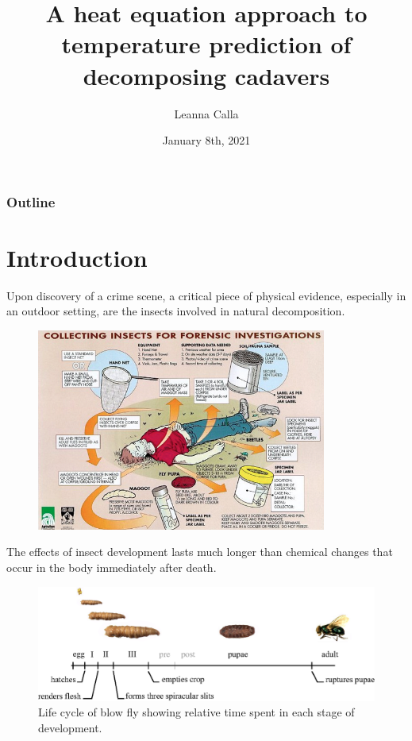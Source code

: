 \documentclass{beamer}
\title{A heat equation approach to temperature prediction of decomposing cadavers}
\author{Leanna Calla}
\institute{University of Ontario Institute of Technology}
\date{January 8th, 2021}
\begin{document}
\frame{\titlepage}

\begin{frame}
  \frametitle{Outline}
\tableofcontents
\end{frame}

\section{Introduction}
  
\begin{frame}
  Upon discovery of a crime scene, a critical piece of physical
  evidence, especially in an outdoor setting, are the insects involved
  in natural decomposition.
  \begin{figure}
    \includegraphics[width=0.85\textwidth]{Figures/scene2}
 
 \end{figure}
\end{frame}

\begin{frame}
   The effects of insect development lasts much longer than
  chemical changes that occur in the body immediately after death.
  \begin{figure}
    \includegraphics[width=\textwidth]{Figures/blowflycycle}
      \caption{Life cycle of blow fly showing relative time spent in
      each stage of development.}
  \end{figure}

\end{frame}
\end{document}
